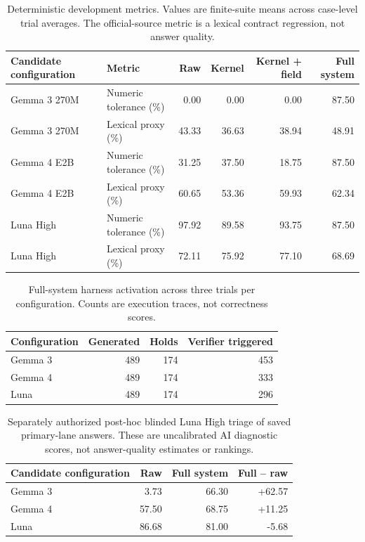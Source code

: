 \begin{table}[t]
\centering
\caption{Deterministic development metrics. Values are finite-suite means across case-level trial averages. The official-source metric is a lexical contract regression, not answer quality.}
\label{tab:metrics}
\small
\begin{tabular}{llrrrr}
\toprule
Candidate configuration & Metric & Raw & Kernel & Kernel + field & Full system \\
\midrule
Gemma 3 270M & Numeric tolerance (\%) & 0.00 & 0.00 & 0.00 & 87.50 \\
Gemma 3 270M & Lexical proxy (\%) & 43.33 & 36.63 & 38.94 & 48.91 \\
Gemma 4 E2B & Numeric tolerance (\%) & 31.25 & 37.50 & 18.75 & 87.50 \\
Gemma 4 E2B & Lexical proxy (\%) & 60.65 & 53.36 & 59.93 & 62.34 \\
Luna High & Numeric tolerance (\%) & 97.92 & 89.58 & 93.75 & 87.50 \\
Luna High & Lexical proxy (\%) & 72.11 & 75.92 & 77.10 & 68.69 \\
\bottomrule
\end{tabular}
\end{table}

\begin{table}[t]
\centering
\caption{Full-system harness activation across three trials per configuration. Counts are execution traces, not correctness scores.}
\label{tab:harness}
\small
\begin{tabular}{lrrr}
\toprule
Configuration & Generated & Holds & Verifier triggered \\
\midrule
Gemma 3 & 489 & 174 & 453 \\
Gemma 4 & 489 & 174 & 333 \\
Luna & 489 & 174 & 296 \\
\bottomrule
\end{tabular}
\end{table}

\begin{table}[t]
\centering
\caption{Separately authorized post-hoc blinded Luna High triage of saved primary-lane answers. These are uncalibrated AI diagnostic scores, not answer-quality estimates or rankings.}
\label{tab:posthoc-triage}
\small
\begin{tabular}{lrrr}
\toprule
Candidate configuration & Raw & Full system & Full -- raw \\
\midrule
Gemma 3 & 3.73 & 66.30 & +62.57 \\
Gemma 4 & 57.50 & 68.75 & +11.25 \\
Luna & 86.68 & 81.00 & -5.68 \\
\bottomrule
\end{tabular}
\end{table}
